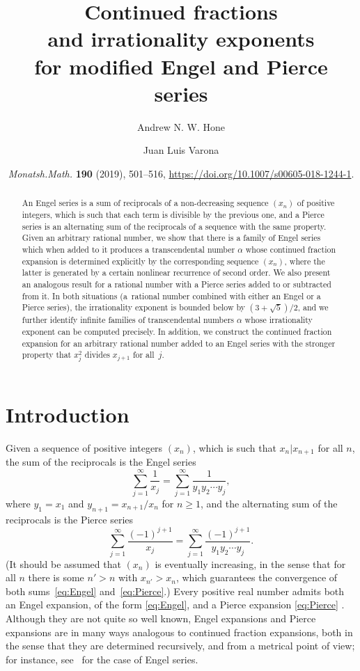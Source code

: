 \documentclass[10pt, a4paper]{amsart}
\title[Continued fractions and irrationality exponents]{Continued fractions\\
and irrationality exponents\\
for modified Engel and Pierce series}
\author{Andrew N. W. Hone}
\author{Juan Luis Varona}
\date{\textit{Monatsh.\@ Math.\@} \textbf{190} (2019), 501--516, 
\url{https://doi.org/10.1007/s00605-018-1244-1}.}
\numberwithin{equation}{section}
\theoremstyle{plain}
\theoremstyle{definition}
\begin{document}

\begin{abstract} 
An Engel series is a sum of reciprocals of a non-decreasing 
sequence $(x_n)$ of positive integers, which is such that 
each term is divisible by the previous one, and a Pierce series 
is an alternating sum of the reciprocals of a sequence with the 
same property. Given an arbitrary rational number, we show that 
there is a family of Engel series which when added to it  
produces a transcendental number $\alpha$ whose continued fraction 
expansion is determined explicitly by the corresponding 
sequence $(x_n)$, where the latter is generated 
by a certain  nonlinear recurrence of second order. 
We also present an analogous result for a rational number with 
a Pierce series added to or subtracted from it. In both situations 
(a~rational number combined with either an Engel or a Pierce series), 
the irrationality exponent is bounded 
below by $(3+\sqrt{5})/2$, and we further identify 
infinite families of transcendental numbers $\alpha$ whose 
irrationality exponent can be computed precisely. 
In addition, we construct the continued fraction expansion for 
an arbitrary rational number added to an Engel series with the 
stronger property that $x_j^2$ divides $x_{j+1}$ for all~$j$.
\end{abstract}

\maketitle


\section{Introduction} 
\label{sec:intro}


Given a sequence of positive integers $(x_n)$, which is such that $x_n | x_{n+1}$ 
 for all $n$, the sum of the reciprocals is the Engel series
\begin{equation}
\label{eq:Engel}
  \sum_{j=1}^{\infty} \frac{1}{x_j}
  = \sum_{j=1}^{\infty} \frac{1}{y_1y_2 \cdots y_j},
\end{equation}
where $y_1 = x_1$ and $y_{n+1} = x_{n+1}/x_n$ for $n \ge 1$,
and the alternating sum of the reciprocals is the Pierce series
\begin{equation}
\label{eq:Pierce}
  \sum_{j=1}^{\infty} \frac{(-1)^{j+1}}{x_j}
  = \sum_{j=1}^{\infty} \frac{(-1)^{j+1}}{y_1y_2 \cdots y_j}.
\end{equation}
(It should be assumed that $(x_n)$ is eventually increasing, in the 
sense that for all $n$ there is some $n'>n$ with $x_{n'}>x_n$, 
which guarantees the convergence of both sums~\eqref{eq:Engel} and~\eqref{eq:Pierce}.) 
Every positive real number admits both an Engel expansion, of the 
form \eqref{eq:Engel}, and a Pierce expansion \eqref{eq:Pierce} \cite{duverney}. 
Although they are not quite so well known, 
Engel expansions and Pierce expansions are in many ways analogous to 
continued fraction expansions, both in the sense that they are determined recursively, 
and from a metrical point of view; for instance, see~\cite{erdosetal} 
for the case of Engel series. 
\end{document}
